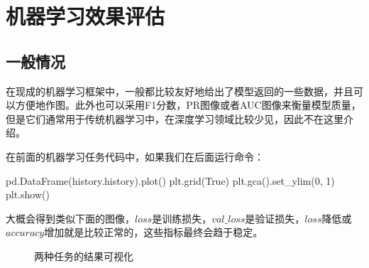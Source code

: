 \documentclass[a5paper, 11pt, openany]{book}
\begin{document}

\chapter{机器学习效果评估} \label{评价方法}

\section{一般情况}

在现成的机器学习框架中，一般都比较友好地给出了模型返回的一些数据，并且可以方便地作图。此外也可以采用F1分数，PR图像或者AUC图像来衡量模型质量，但是它们通常用于传统机器学习中，在深度学习领域比较少见，因此不在这里介绍。

在前面的机器学习任务代码中，如果我们在后面运行命令：

\begin{python}
pd.DataFrame(history.history).plot()
plt.grid(True)
plt.gca().set_ylim(0, 1)
plt.show()
\end{python}

大概会得到类似下面的图像，$loss$是训练损失，$val\_loss$是验证损失，$loss$降低或$accuracy$增加就是比较正常的，这些指标最终会趋于稳定。

\newpage

\begin{figure}[h]
    \centering
    \caption{两种任务的结果可视化}
\end{figure}
\end{document}
